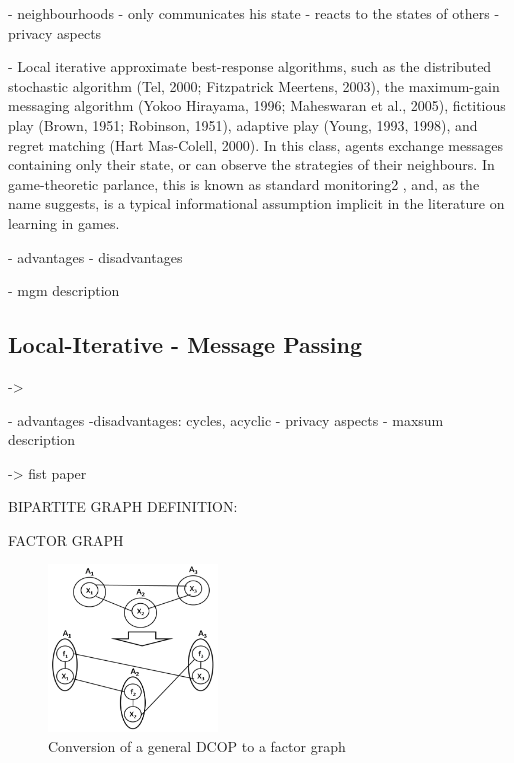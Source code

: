 
- neighbourhoods
- only communicates his state
- reacts to the states of others
- privacy aspects

\cite{Chapman2011}
\cite{Chapman2010}
\cite{Maheswaran} %

    - Local iterative approximate best-response algorithms, such as the distributed stochastic algorithm
(Tel, 2000; Fitzpatrick  Meertens, 2003), the maximum-gain messaging algorithm (Yokoo 
Hirayama, 1996; Maheswaran et al., 2005), fictitious play (Brown, 1951; Robinson, 1951),
adaptive play (Young, 1993, 1998), and regret matching (Hart  Mas-Colell, 2000). In this class,
agents exchange messages containing only their state, or can observe the strategies of their
neighbours. In game-theoretic parlance, this is known as standard monitoring2
, and, as the name
suggests, is a typical informational assumption implicit in the literature on learning in games.


    - advantages
    - disadvantages
    
    - mgm description
    






\subsection{Local-Iterative - Message Passing}

    
    \cite{Chapman2011} -> 
    
    - advantages
    -disadvantages: cycles, acyclic
    - privacy aspects
    - maxsum description


    \cite{Farinelli2008} -> fist paper

BIPARTITE GRAPH DEFINITION:

FACTOR GRAPH

\begin{figure}[H]
\centering
\includegraphics[width=170px]{graphics/factorgraph}
\caption{Conversion of a general DCOP to a factor graph\cite{Zivan2012}}
\label{fig:factorgraph}
\end{figure}

